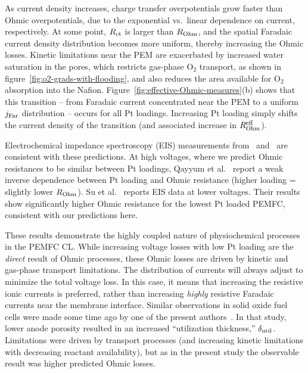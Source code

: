 \documentclass[final,3p,times,twocolumn]{elsarticle}    %
\newcommand{\scd}[1]{\color{red} #1 \color{black}}%
\begin{document}
As current density increases, charge transfer overpotentials grow faster than Ohmic overpotentials, due to the exponential vs.~linear dependence on current, respectively. At some point, $R_{\rm ct}$ is larger than $R_{\rm Ohm}$, and the spatial Faradaic current density distribution becomes more uniform, thereby increasing the Ohmic losses. Kinetic limitations near the PEM are exacerbated by increased water saturation in the pores, which restricts gas-phase O$_2$ transport, as shown in figure~\ref{fig:o2-grads-with-flooding}, and also reduces the area available for O$_2$ absorption into the Nafion. Figure~\ref{fig:effective-Ohmic-measures}(b) shows that this transition -- from Faradaic current concentrated near the PEM to a uniform $j_{\rm Far}$ distribution -- occurs for all Pt loadings. Increasing Pt loading simply shifts the current density of the transition (and associated increase in $R_{\rm Ohm}^{\rm eff}$). 

\scd{Electrochemical impedance spectroscopy (EIS) measurements from~\cite{bib:su_2014} and~\cite{bib:qayyum_2016} are consistent with these predictions. At high voltages, where we predict Ohmic resistances to be similar between Pt loadings, Qayyum et al.~\cite{bib:qayyum_2016}}\scd{ report a weak inverse dependence between Pt loading and Ohmic resistance (higher loading = slightly lower $R_{\rm Ohm}$). Su et al.~\cite{bib:su_2014} reports EIS data at lower voltages. Their results show significantly higher Ohmic resistance for the lowest Pt loaded PEMFC, consistent with our predictions here. }

These results demonstrate the highly coupled nature of physiochemical processes in the PEMFC CL. While increasing voltage losses with low Pt loading are the \emph{direct} result of Ohmic processes, these Ohmic losses are driven by kinetic and gas-phase transport limitations. The distribution of currents will always adjust to minimize the total voltage loss. In this case, it means that increasing the resistive ionic currents is preferred, rather than increasing \emph{highly} resistive Faradaic currents near the membrane interface. Similar observations in solid oxide fuel cells  were made some time ago by one of the present authors~\cite{bib:decaluwe_2008}. In that study, lower anode porosity resulted in an increased ``utilization thickness,'' $\delta_{\rm util}$. Limitations were driven by transport processes (and increasing kinetic limitations with decreasing reactant availability), but as in the present study the observable result was higher predicted Ohmic losses.
\end{document}
